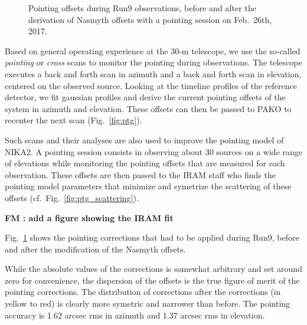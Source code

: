 \begin{figure}[p]
\begin{center}
\caption{Pointing offsets during Run9 observations, before and after the
  derivation of Nasmyth offsets with a pointing session on Feb.~26th, 2017.}
\label{fig:pointing_stats_n2r9}
\end{center}
\end{figure}

Based on general operating experience at the 30-m telescope, we use the so-called
{\em pointing} or {\em cross} scans to monitor the pointing during observations. The
telescope executes a back and forth scan in azimuth and a back and forth scan in
elevation, centered on the observed source. Looking at the timeline profiles of
the reference detector, we fit gaussian profiles and derive the current pointing
offsets of the system in azimuth and elevation. These offsets can then be passed
to PAKO to recenter the next scan (Fig.~\ref{fig:ptg}).

Such scans and their analyses are also used to improve the pointing model
of NIKA2. A pointing session consists in observing about 30 sources on a wide
range of elevations while monitoring the pointing offsets that are measured for
each observation. These offsets are then passed to the IRAM staff who finds
the pointing model parameters that minimize and symetrize the scattering of
these offsets (cf.~Fig.~\ref{fig:ptg_scattering}).

{\bf FM : add a figure showing the IRAM fit}

Fig.~\ref{fig:pointing_stats_n2r9} shows
the pointing corrections that had to be applied during Run9, before and after
the modification of the Nasmyth offsets. 




While the absolute values of the
corrections is somewhat arbitrary and set around zero for convenience, the
dispersion of the offsets is the true figure of merit of the pointing
corrections. The distribution of corrections after the corrections (in yellow to
red) is clearly more symetric and narrower than before. The pointing accuracy is
1.62 arcsec rms in azimuth and 1.37 arcsec rms in elevation.
